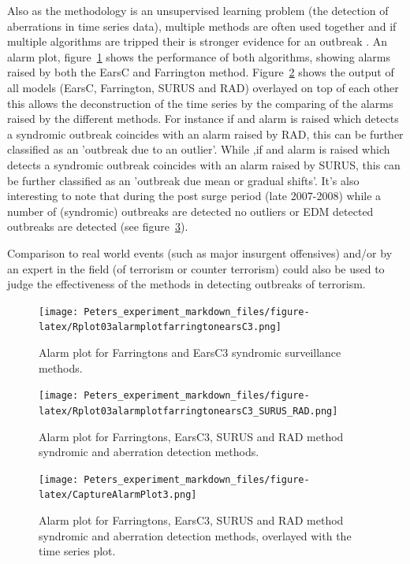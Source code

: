 Also as the methodology is an unsupervised learning problem (the detection of aberrations in time series data), multiple methods are often used together and if multiple algorithms are tripped their is stronger evidence for an outbreak \citep{reis2003time}. An alarm plot, figure~\ref{fig:alarmplot1} shows the performance of both algorithms, showing alarms raised by both the EarsC and Farrington method. Figure~\ref{fig:alarmplot2} shows the output of all models (EarsC, Farrington, SURUS and RAD) overlayed on top of each other this allows the deconstruction of the time series by the comparing of the alarms raised by the different methods. For instance if and alarm is raised which detects a syndromic outbreak coincides with an alarm raised by RAD, this can be further classified as an 'outbreak due to an outlier'. While ,if and alarm is raised which detects a syndromic outbreak coincides with an alarm raised by SURUS, this can be further classified as an 'outbreak due mean or gradual shifts'. It's also interesting to note that during the post surge period (late 2007-2008) while a number of (syndromic) outbreaks are detected no outliers or EDM detected outbreaks are detected (see figure~\ref{fig:CaptureAlarmPlot3}).

Comparison to real world events (such as major insurgent offensives) and/or by an expert in the field (of terrorism or counter terrorism) could also be used to judge the effectiveness of the methods in detecting outbreaks of terrorism. 


\begin{figure}[t]
\texttt{[image: Peters\_experiment\_markdown\_files/figure-latex/Rplot03alarmplotfarringtonearsC3.png]}
\label{fig:alarmplot1}
\centering
\caption{Alarm plot for Farringtons and EarsC3 syndromic surveillance methods.}
\end{figure}


\begin{figure}[t]
\texttt{[image: Peters\_experiment\_markdown\_files/figure-latex/Rplot03alarmplotfarringtonearsC3\_SURUS\_RAD.png]}
\label{fig:alarmplot2}
\centering
\caption{Alarm plot for Farringtons, EarsC3, SURUS and RAD method syndromic and aberration detection methods.}
\end{figure}


\begin{figure}[t]
\texttt{[image: Peters\_experiment\_markdown\_files/figure-latex/CaptureAlarmPlot3.png]}
\label{fig:CaptureAlarmPlot3}
\centering
\caption{Alarm plot for Farringtons, EarsC3, SURUS and RAD method syndromic and aberration detection methods, overlayed with the time series plot.}
\end{figure}


